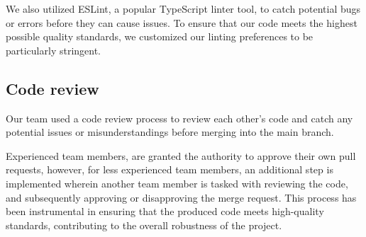 \noindent
We also utilized ESLint, a popular TypeScript linter tool, to catch potential bugs or errors before they can cause issues. To ensure that our code meets the highest possible quality standards, we customized our linting preferences to be particularly stringent. 

\subsection{Code review}

Our team used a code review process to review each other's code and catch any potential issues or misunderstandings before merging into the main branch. 

\noindent
Experienced team members, are granted the authority to approve their own pull requests, however, for less experienced team members, an additional step is implemented wherein another team member is tasked with reviewing the code, and subsequently approving or disapproving the merge request. This process has been instrumental in ensuring that the produced code meets high-quality standards, contributing to the overall robustness of the project.



